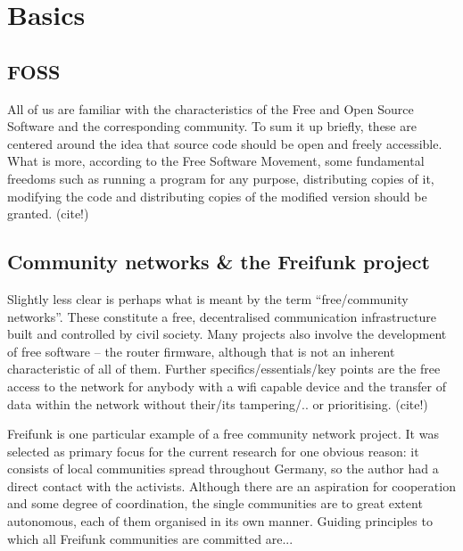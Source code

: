 \section{Basics}
\subsection{FOSS}
All of us are familiar with the characteristics of the Free and Open Source Software and the corresponding community.
To sum it up briefly, these are centered around the idea that source code should be open and freely accessible.
What is more, according to the Free Software Movement,
some fundamental freedoms such as running a program for any purpose, distributing copies of it, modifying the code and distributing copies of the modified version should be granted. (cite!)


\subsection{Community networks \& the Freifunk project}
Slightly less clear is perhaps what is meant by the term ``free/community networks''. %
These constitute a free, decentralised communication infrastructure built and controlled by civil society. %
Many projects also involve the development of free software -- the router firmware, although that is not an inherent characteristic of all of them.
Further specifics/essentials/key points are the free access to the network for anybody with a wifi capable device and the transfer of data within the network without their/its tampering/.. or prioritising. (cite!)

Freifunk is one particular example of a free community network project.
It was selected as primary focus for the current research for one obvious reason: it consists of local communities spread throughout Germany, so the author had a direct contact with the activists.
Although there are an aspiration for cooperation and some degree of coordination, the single communities are to great extent autonomous, each of them organised in its own manner.
Guiding principles to which all Freifunk communities are committed are...

